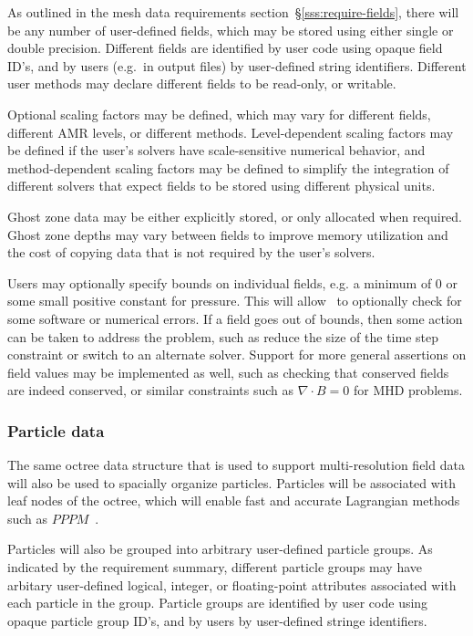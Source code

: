 \documentclass[10pt,twocolumn]{article}
\begin{document}
As outlined in the mesh data requirements
section~\S\ref{sss:require-fields}, there will be any number of
user-defined fields, which may be stored using either single or double
precision.  Different fields are identified by user code using 
opaque field ID's, and by users (e.g.~in output files) by
user-defined string identifiers.  Different user methods may
declare different fields to be read-only, or writable.

Optional scaling factors may be defined, which may vary for different
fields, different AMR levels, or different methods.  Level-dependent
scaling factors may be defined if the user's solvers have
scale-sensitive numerical behavior, and method-dependent scaling
factors may be defined to simplify the integration of different
solvers that expect fields to be stored using different physical
units.

Ghost zone data may be either explicitly stored, or only allocated
when required.  Ghost zone depths may vary between fields to improve
memory utilization and the cost of copying data that is not required
by the user's solvers.  

Users may optionally specify bounds on individual fields, e.g. a
minimum of $0$ or some small positive constant for pressure.  This
will allow \cello\ to optionally check for some software or numerical
errors.  If a field goes out of bounds, then some action can be taken
to address the problem, such as reduce the size of the time step
constraint or switch to an alternate solver.  Support for more general
assertions on field values may be implemented as well, such as checking
that conserved fields are indeed conserved, or similar constraints
such as $\nabla\cdot B=0$ for MHD problems.

\subsubsection{Particle data} \label{sss:design-particles}

The same octree data structure that is used to support
multi-resolution field data will also be used to spacially organize
particles.  Particles will be associated with leaf nodes of the
octree, which will enable fast and accurate Lagrangian methods such
as $PPPM$~\cite{HoEa88}.

Particles will also be grouped into arbitrary user-defined particle
groups.  As indicated by the requirement summary, different particle
groups may have arbitary user-defined logical, integer, or
floating-point attributes associated with each particle in the group.
Particle groups are identified by user code using opaque particle
group ID's, and by users by user-defined stringe identifiers.
\end{document}
